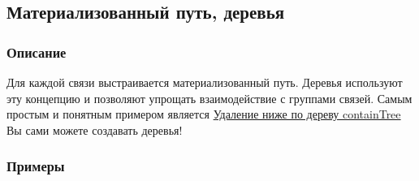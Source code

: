 \documentclass{article}
\begin{document}
\subsection{Материализованный путь, деревья}
\subsubsection{Описание}
Для каждой связи выстраивается материализованный путь. Деревья используют эту
концепцию и позволяют упрощать взаимодействие с группами связей.
Самым простым и понятным примером является
\hyperlink{containTree.Deletion.Example}{Удаление ниже по дереву containTree}
Вы сами можете создавать деревья!
\subsubsection{Примеры}
\end{document}
